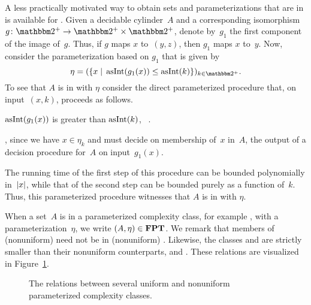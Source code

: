 \begin{example}
\label{ex:p-cylinder}%
  A less practically motivated way to obtain sets and parameterizations that are in  is available for .
  Given a decidable \pdash{}cylinder~$A$ and a corresponding isomorphism~$g\colon \binary^+ \to \binary^+ \times \binary^+$, denote by~$g_1$ the first component of the image of~$g$.
  Thus, if $g$ maps $x$ to~$(y, z)$, then $g_1$ maps $x$ to~$y$.
  Now, consider the parameterization based on $g_1$ that is given by
  \begin{equation*}
    \eta \deq (\{x \st \asNat(g_1(x)) \le \asNat(k)\})_{k \in \binary^+}.
  \end{equation*}
  To see that $A$ is in  with $\eta$ consider the direct parameterized procedure that, on input~$(x, k)$, proceeds as follows.
  \begin{codelisting}
  \item
     $\asNat(g_1(x))$ is greater than $\asNat(k)$, ~.
  \item
    , since we have $x \in \eta_k$ and must decide on membership of~$x$ in~$A$,
    \itemcont {} the output of a decision procedure for~$A$ on input~$g_1(x)$.
  \end{codelisting}
  The running time of the first step of this procedure can be bounded polynomially in~${\lvert x\rvert}$, while that of the second step can be bounded purely as a function of~$k$.
  Thus, this parameterized procedure witnesses that $A$ is in  with $\eta$.
\end{example}

When a set~$A$ is in a parameterized complexity class, for example , with a parameterization~$\eta$, we write $(A, \eta) \in \textnormal{\textbf{FPT}}$.
We remark that members of (nonuniform)  need not be in (nonuniform)  \parencite{downey1999parameterized,flum2006parameterized}.
Likewise, the classes  and  are strictly smaller than their nonuniform counterparts,  and  \parencite{downey1993fixed}.
These relations are visualized in Figure~\ref{fig:parameterized_classes}.
\begin{figure}
  \centering
  \caption{
    The relations between several uniform and nonuniform parameterized complexity classes.
  }
  \label{fig:parameterized_classes}
\end{figure}

